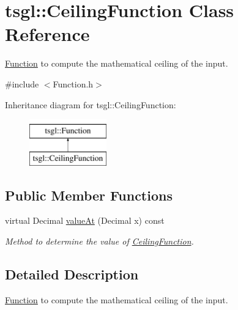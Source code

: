 \hypertarget{classtsgl_1_1_ceiling_function}{\section{tsgl\-:\-:Ceiling\-Function Class Reference}
\label{classtsgl_1_1_ceiling_function}
}


\hyperlink{classtsgl_1_1_function}{Function} to compute the mathematical ceiling of the input.  




{\ttfamily \#include $<$Function.\-h$>$}

Inheritance diagram for tsgl\-:\-:Ceiling\-Function\-:\begin{figure}[H]
\begin{center}
\leavevmode
\includegraphics[height=2.000000cm]{classtsgl_1_1_ceiling_function}
\end{center}
\end{figure}
\subsection*{Public Member Functions}
\begin{DoxyCompactItemize}
\item 
virtual Decimal \hyperlink{classtsgl_1_1_ceiling_function_ab47498860b2395e331f203c4025bcb81}{value\-At} (Decimal x) const 
\begin{DoxyCompactList}\small\item\em Method to determine the value of \hyperlink{classtsgl_1_1_ceiling_function}{Ceiling\-Function}. \end{DoxyCompactList}\end{DoxyCompactItemize}


\subsection{Detailed Description}
\hyperlink{classtsgl_1_1_function}{Function} to compute the mathematical ceiling of the input. 

